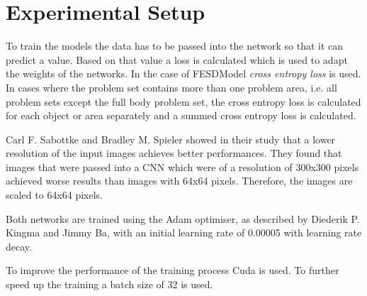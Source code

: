 \section{Experimental Setup}
\label{sec:model_training}

To train the models the data has to be passed into the network so that it can predict a value. Based on that value a loss is calculated which is used to adapt the weights of the networks. In the case of FESDModel \textit{cross entropy loss} is used. In cases where the problem set contains more than one problem area, i.e. all problem sets except the full body problem set, the cross entropy loss is calculated for each object or area separately and a summed cross entropy loss is calculated.

Carl F. Sabottke and Bradley M. Spieler showed in their study that a lower resolution of the input images achieves better performances\cite{LowResGood}. They found that images that were passed into a CNN which were of a resolution of 300x300 pixels achieved worse results than images with 64x64 pixels. Therefore, the images are scaled to 64x64 pixels.

Both networks are trained using the Adam optimiser, as described by Diederik P. Kingma and Jimmy Ba\cite{kingma2017adam}, with an initial learning rate of 0.00005 with learning rate decay.

To improve the performance of the training process Cuda is used. To further speed up the training a batch size of 32 is used.